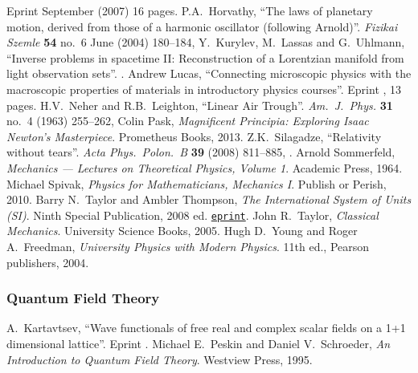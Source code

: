 \begin{thebibliography}{99}
  Eprint  September (2007) 16 pages.
  P.A.~Horvathy,
  ``The laws of planetary motion, derived from those of a harmonic oscillator (following Arnold)''.
  \emph{Fizikai Szemle} \textbf{54} no.~6 June (2004) 180--184,
  Y.~Kurylev, M.~Lassas and G.~Uhlmann,
  ``Inverse problems in spacetime II: Reconstruction of a Lorentzian manifold from light observation sets''.
  .
  Andrew Lucas,
  ``Connecting microscopic physics with the macroscopic properties of materials in introductory physics courses''.
  Eprint , 13 pages.
  H.V.~Neher and R.B.~Leighton,
  ``Linear Air Trough''.
  \emph{Am.\ J.\ Phys.} {\bf 31} no.~4 (1963) 255--262,
  Colin Pask,
  \emph{Magnificent Principia: Exploring Isaac Newton's Masterpiece}.
  Prometheus Books, 2013.
  Z.K.~Silagadze,
  ``Relativity without tears''.
  \emph{Acta Phys.~Polon.~B} {\bf 39} (2008) 811--885,
  .
  Arnold Sommerfeld,
  \emph{Mechanics --- Lectures on Theoretical Physics, Volume 1}.
  Academic Press, 1964.
  Michael Spivak,
  \emph{Physics for Mathematicians, Mechanics I}.
  Publish or Perish, 2010.
  Barry N.\ Taylor and Ambler Thompson, 
  \emph{The International System of Units (SI)}.
  Ninth Special Publication, 2008 ed.
  \href{http://physics.nist.gov/Pubs/SP330/sp330.pdf}{{\tt eprint}}.
  John R.~Taylor,
  \emph{Classical Mechanics}.
  University Science Books, 2005.
  Hugh D.~Young and Roger A.~Freedman,
  \emph{University Physics with Modern Physics}.
  11th ed., Pearson publishers, 2004.

\subsubsection*{Quantum Field Theory}
  A.~Kartavtsev,
  ``Wave functionals of free real and complex scalar fields on a 1+1 dimensional lattice''.
  Eprint .
  Michael E.~Peskin and Daniel V.~Schroeder,
  \emph{An Introduction to Quantum Field Theory}.
  Westview Press, 1995.


\end{thebibliography}
